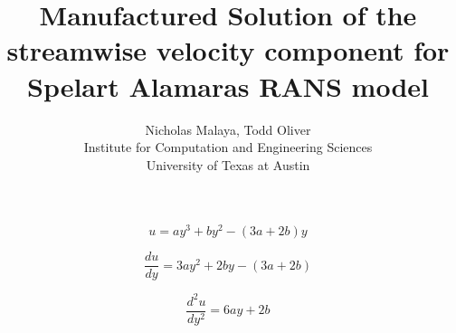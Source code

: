 \documentclass{article}
\title{\bf{Manufactured Solution of the streamwise velocity component for Spelart Alamaras RANS model}}
\author{Nicholas Malaya, Todd Oliver \\ Institute for Computation and Engineering Sciences \\ University of Texas at Austin} \date{}
\begin{document}
\maketitle
\begin{equation}
  u = a y^3 + b y^2 - (3a +2b)y
\end{equation}

\begin{equation}
  \frac{du}{dy} = 3 a y^2 + 2 b y - (3a +2b)
\end{equation}

\begin{equation}
  \frac{d^2u}{dy^2} = 6 a y + 2 b
\end{equation}
\end{document}
